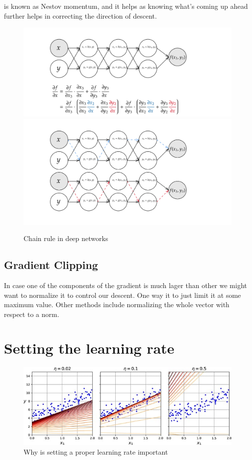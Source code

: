 is known as Nestov momentum, and it helps as knowing what's coming up ahead further helps
in correcting the direction of descent.
\begin{figure}
    \begin{center}
        \includegraphics[width=\textwidth]{graphics/revmodeautodiff.png}
        \includegraphics[width=\textwidth]{graphics/path comp.png}
    \end{center}
    \caption{Chain rule in deep networks}\label{path}
\end{figure}

\subsection{Gradient Clipping}
In case one of the components of the gradient is much lager than other we
might want to normalize it to control our descent. One way it to just limit it at some maximum value. Other methods include normalizing the whole vector with respect to a norm.
\section{Setting the learning rate}
\begin{figure}
    \includegraphics[width=\textwidth]{graphics/learning rate.jpeg}
    \caption{Why is setting a proper learning rate important\citep{geron2022hands}}
\end{figure}
